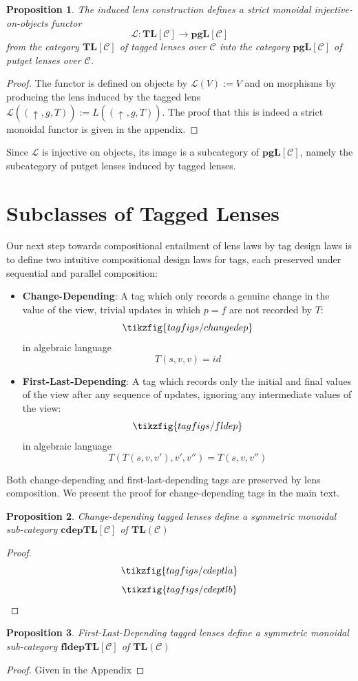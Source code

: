 \documentclass[a4paper,11pt]{article}
\newcommand{\cat}{\mathbf}
\newcommand{\putt}[1]{\mathbin{\uparrow_{#1}}}
\theoremstyle{definition}
\theoremstyle{plain}
\newtheorem{prop}{Proposition}
\theoremstyle{plain}
\theoremstyle{definition}
\begin{document}
\begin{prop}
The induced lens construction defines a strict monoidal injective-on-objects functor \[\mathcal{L}:\cat{TL}[\mathcal{C}] \longrightarrow \cat{pgL}[\mathcal{C}]\] from the category $\cat{TL}[\mathcal{C}]$ of tagged lenses over $\mathcal{C}$ into the category $\cat{pgL}[\mathcal{C}]$ of putget lenses over $\mathcal{C}$.
\end{prop}
\begin{proof}
The functor is defined on objects by $\mathcal{L}(V) := V$ and on morphisms by producing the lens induced by the tagged lens $\mathcal{L}((\putt{},g,T)) := L((\putt{},g,T))$. The proof that this is indeed a strict monoidal functor is given in the appendix. 
\end{proof}
Since $\mathcal{L}$ is injective on objects, its image is a subcategory of $\cat{pgL}[\mathcal{C}]$, namely the subcategory of putget lenses induced by tagged lenses.

\section{Subclasses of Tagged Lenses}
Our next step towards compositional entailment of lens laws by tag design laws is to define two intuitive compositional design laws for tags, each preserved under sequential and parallel composition:
\begin{itemize}
    \item \textbf{Change-Depending}: A tag which only records a genuine change in the value of the view, trivial updates in which $p=f$ are not recorded by $T$: \[\tikzfig{tagfigs/changedep}\] in algebraic language \[T(s,v,v) = id\]
    \item \textbf{First-Last-Depending}: A tag which records only the initial and final values of the view after any sequence of updates, ignoring any intermediate values of the view: \[\tikzfig{tagfigs/fldep}\] in algebraic language \[T(T(s,v,v'),v',v'') = T(s,v,v'')\]
\end{itemize}
Both change-depending and first-last-depending tags are preserved by lens composition. We present the proof for change-depending tags in the main text.
\begin{prop}
Change-depending tagged lenses define a symmetric monoidal sub-category $\mathbf{cdepTL}[\mathcal{C}]$ of $\cat{TL}(\mathcal{C})$ 
\end{prop}
\begin{proof}
\[\tikzfig{tagfigs/cdeptla}\]
\[\tikzfig{tagfigs/cdeptlb}\]
\end{proof}
\begin{prop}
First-Last-Depending tagged lenses define a symmetric monoidal sub-category $\mathbf{fldepTL}[\mathcal{C}]$ of $\cat{TL}(\mathcal{C})$
\end{prop}
\begin{proof}
Given in the Appendix
\end{proof}
\end{document}
